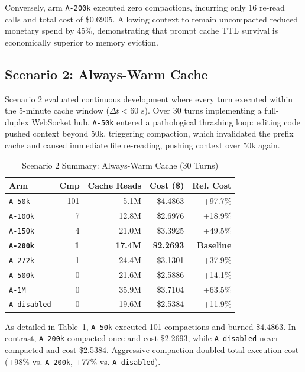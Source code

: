 \documentclass[10pt,twocolumn,a4paper]{article}
\begin{document}
Conversely, arm \texttt{A-200k} executed zero compactions, incurring only 16 re-read calls and total cost of \$0.6905. Allowing context to remain uncompacted reduced monetary spend by 45\%, demonstrating that prompt cache TTL survival is economically superior to memory eviction.

\subsection{Scenario 2: Always-Warm Cache}
Scenario 2 evaluated continuous development where every turn executed within the 5-minute cache window ($\Delta t < 60\text{ s}$). Over 30 turns implementing a full-duplex WebSocket hub, \texttt{A-50k} entered a pathological thrashing loop: editing code pushed context beyond 50k, triggering compaction, which invalidated the prefix cache and caused immediate file re-reading, pushing context over 50k again.

\begin{table}[t]
\caption{Scenario 2 Summary: Always-Warm Cache (30 Turns)}
\label{tab:scenario2}
\centering
\footnotesize
\setlength{\tabcolsep}{2.2pt}
\begin{tabular}{@{}lrrrr@{}}
\toprule
\textbf{Arm} & \textbf{Cmp} & \textbf{Cache Reads} & \textbf{Cost (\$)} & \textbf{Rel. Cost} \\
\midrule
\texttt{A-50k} & 101 & 5.1M & \$4.4863 & +97.7\% \\
\texttt{A-100k} & 7 & 12.8M & \$2.6976 & +18.9\% \\
\texttt{A-150k} & 4 & 21.0M & \$3.3925 & +49.5\% \\
\textbf{\texttt{A-200k}} & \textbf{1} & \textbf{17.4M} & \textbf{\$2.2693} & \textbf{Baseline} \\
\texttt{A-272k} & 1 & 24.4M & \$3.1301 & +37.9\% \\
\texttt{A-500k} & 0 & 21.6M & \$2.5886 & +14.1\% \\
\texttt{A-1M} & 0 & 35.9M & \$3.7104 & +63.5\% \\
\texttt{A-disabled} & 0 & 19.6M & \$2.5384 & +11.9\% \\
\bottomrule
\end{tabular}
\end{table}

As detailed in Table~\ref{tab:scenario2}, \texttt{A-50k} executed 101 compactions and burned \$4.4863. In contrast, \texttt{A-200k} compacted once and cost \$2.2693, while \texttt{A-disabled} never compacted and cost \$2.5384. Aggressive compaction doubled total execution cost (+98\% vs. \texttt{A-200k}, +77\% vs. \texttt{A-disabled}).
\end{document}
